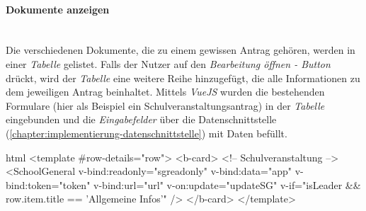 \paragraph{Dokumente anzeigen}
~\\
Die verschiedenen Dokumente, die zu einem gewissen Antrag gehören, werden in einer \textit{Tabelle} gelistet. Falls der Nutzer auf den \textit{Bearbeitung öffnen - Button} drückt, wird der \textit{Tabelle} eine weitere Reihe hinzugefügt, die alle Informationen zu dem jeweiligen Antrag beinhaltet. Mittels \textit{VueJS} wurden die bestehenden Formulare (hier als Beispiel ein Schulveranstaltungsantrag) in der \textit{Tabelle} eingebunden und die \textit{Eingabefelder} über die Datenschnittstelle (\autoref{chapter:implementierung-datenschnittstelle}) mit Daten befüllt.
\begin{code}{html}
	<template #row-details="row">
        <b-card>
            <!-- Schulveranstaltung -->
            <SchoolGeneral
            v-bind:readonly="sgreadonly"
            v-bind:data="app"
            v-bind:token="token"
            v-bind:url="url"
            v-on:update="updateSG"
            v-if="isLeader && row.item.title == 'Allgemeine Infos'"
            />
		</b-card>
	</template>
\end{code}
	\label{list:docanz} ~\\
\newpage
